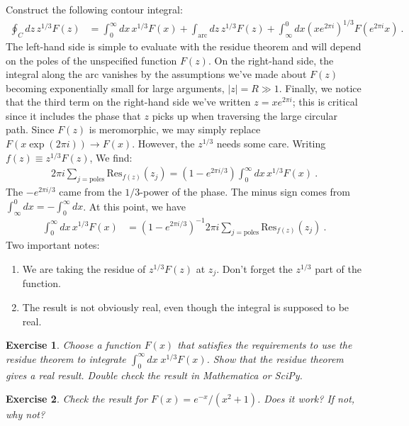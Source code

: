 \documentclass[
  11pt,
	colorful,
	raggedright,
]{tufte-style-thesis-flip}
\newtheorem{exercise}{Exercise}[section]
\begin{document}
Construct the following contour integral:
 \begin{align}
  \oint_C  dz\, z^{1/3} F(z) &= 
  \int_0^\infty dx \,  x^{1/3}F(x)
  + \int_{\text{arc}} dz \, z^{1/3} F(z)
  + \int_\infty^0 dx \left(x e^{2\pi i}\right)^{1/3} F\left(e^{2\pi i} x\right) \ .
 \end{align}
 The left-hand side is simple to evaluate with the residue theorem and will depend on the poles of the unspecified function $F(z)$. On the right-hand side, the integral along the arc vanishes by the assumptions we've made about $F(z)$ becoming exponentially small for large arguments, $|z|=R\gg 1$.  Finally, we notice that the third term on the right-hand side we've written $z=xe^{2\pi i}$; this is critical since it includes the phase that $z$ picks up when traversing the large circular path. Since $F(z)$ is meromorphic, we may simply replace $F(x\exp(2\pi i)) \to F(x)$. However, the $z^{1/3}$ needs some care. Writing $f(z)\equiv z^{1/3}F(z)$, We find:
 \begin{align}
  2\pi i \sum_{j=\text{poles}}  \text{Res}_{f(z)}(z_j)
  =
  \left(1-e^{2\pi i/3}\right) \int_0^\infty dx\,  x^{1/3} F(x) \ .
 \end{align}
The $-e^{2\pi i/3}$ came from the $1/3$-power of the phase. The minus sign comes from $\int_{\infty}^0 dx = -\int_0^\infty dx$. At this point, we have
\begin{align}
  \int_0^\infty dx \, x^{1/3}F(x)
  &= 
  \left(1-e^{2\pi i/3} \right)^{-1}
  2\pi i \sum_{j=\text{poles}}  \text{Res}_{f(z)}(z_j) \ .
\end{align}
Two important notes:
\begin{enumerate}
  \item We are taking the residue of $z^{1/3}F(z)$ at $z_j$. Don't forget the $z^{1/3}$ part of the function.
  \item The result is not obviously real, even though the integral is supposed to be real. 
\end{enumerate}
\begin{exercise}
Choose a function $F(x)$ that satisfies the requirements to use the residue theorem to integrate $\int_0^\infty dx\; x^{1/3}F(x)$. Show that the residue theorem gives a real result. Double check the result in \emph{Mathematica} or \emph{SciPy}.
\end{exercise}
\begin{exercise}
Check the result for $F(x) = e^{-x}/(x^2+1)$. Does it work? If not, why not?
\end{exercise}
\end{document}
